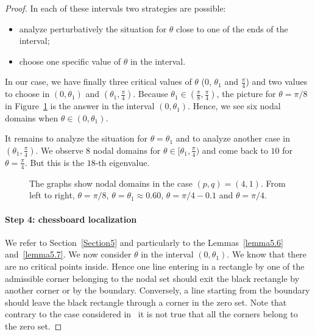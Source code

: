 \documentclass[a4paper,reqno,11pt]{amsart}
\theoremstyle{remark}
\theoremstyle{definition}
\numberwithin{equation}{section}
\begin{document}
\begin{proof}
In each of these intervals  two strategies are possible:
\begin{itemize}
\item analyze perturbatively the situation for $\theta$ close to one of the 
ends of the interval;
\item choose one specific value of $\theta$ in the interval.
\end{itemize}
In our case, we have finally three critical values of $\theta$ 
($0$, $\theta_1$ and $\frac \pi 4$) and two values to choose in $(0,\theta_1)$ 
and $(\theta_1,\frac \pi 4)$. Because $\theta_1 \in (\frac \pi 8,\frac \pi 4)$, 
the picture for $\theta=\pi/8$ in Figure~\ref{fig:4-1} is the answer in the 
interval $(0,\theta_1)$.
Hence, we see six nodal domains  when $ \theta \in (0,\theta_1)$.

It remains to analyze the situation for $\theta =\theta_1$  and to analyze 
another case in $(\theta_1,\frac \pi 4)$. We  observe $8$ nodal domains for 
$\theta \in [\theta_1,\frac \pi 4)$ and come back to $10$ for 
$\theta=\frac \pi 4$. But this is the $18$-th eigenvalue.

\begin{figure}[htp]
\centering
{}
\caption{The graphs show nodal domains in the case $(p,q)=(4,1)$. From left
to right, $\theta=\pi/8$, $\theta=\theta_1\approx 0.60$, $\theta=\pi/4-0.1$ and
$\theta=\pi/4$.}
\label{fig:4-1}
\end{figure}

\paragraph{\bfseries Step 4: chessboard localization}
We refer to Section~\ref{Section5} and particularly to the Lemmas~\ref{lemma5.6} 
and~\ref{lemma5.7}.
We now consider $\theta$ in the interval $(0,\theta_1)$. We know that there are 
no critical points inside. Hence one line entering in a rectangle by one of the 
admissible corner belonging to the nodal set should exit the black rectangle by 
another corner or by the boundary. Conversely, a line starting from the 
boundary should leave the black rectangle through a corner in the zero set. 
Note that contrary to the case considered in~\cite{BH} it is not true that 
all the corners belong to the zero set.


\end{proof}
\end{document}
